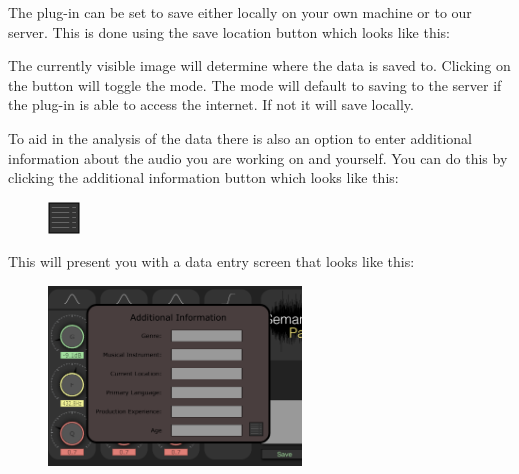 \documentclass[a4paper]{article}
\begin{document}
		The plug-in can be set to save either locally on your own machine or to our server. This is done using the save location button which looks like this:

		\begin{figure}[h!]
			\centering
		\end{figure}

		The currently visible image will determine where the data is saved to. Clicking on the button will toggle the mode. The mode will default to saving to the server if the plug-in is able to access the internet. If not it will save locally.

		To aid in the analysis of the data there is also an option to enter additional information about the audio you are working on and yourself. You can do this by clicking the additional information button which looks like this:

		\begin{figure}[h!]
			\centering
			\includegraphics[scale=1]{Images/metadata.png}
		\end{figure}

		This will present you with a data entry screen that looks like this:

		\begin{figure}[h!]
			\centering
			\includegraphics[width=0.6\textwidth]{Images/MetaDataScreen.png}
		\end{figure}
\end{document}
